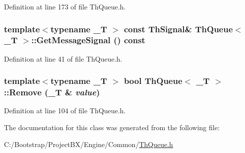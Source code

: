 Definition at line 173 of file ThQueue.h.\hypertarget{class_th_queue_9691f2334e353fd22d977b4b47e116c5}{
\subsubsection[{GetMessageSignal}]{\setlength{\rightskip}{0pt plus 5cm}template$<$typename \_\-T $>$ const {\bf ThSignal}\& {\bf ThQueue}$<$ \_\-T $>$::GetMessageSignal () const}}
\label{class_th_queue_9691f2334e353fd22d977b4b47e116c5}




Definition at line 41 of file ThQueue.h.\hypertarget{class_th_queue_a4f3c29b0686392b3451ca96b5d8b892}{
\subsubsection[{Remove}]{\setlength{\rightskip}{0pt plus 5cm}template$<$typename \_\-T $>$ bool {\bf ThQueue}$<$ \_\-T $>$::Remove (\_\-T \& {\em value})}}
\label{class_th_queue_a4f3c29b0686392b3451ca96b5d8b892}




Definition at line 104 of file ThQueue.h.

The documentation for this class was generated from the following file:\begin{CompactItemize}
\item 
C:/Bootstrap/ProjectBX/Engine/Common/\hyperlink{_th_queue_8h}{ThQueue.h}\end{CompactItemize}
